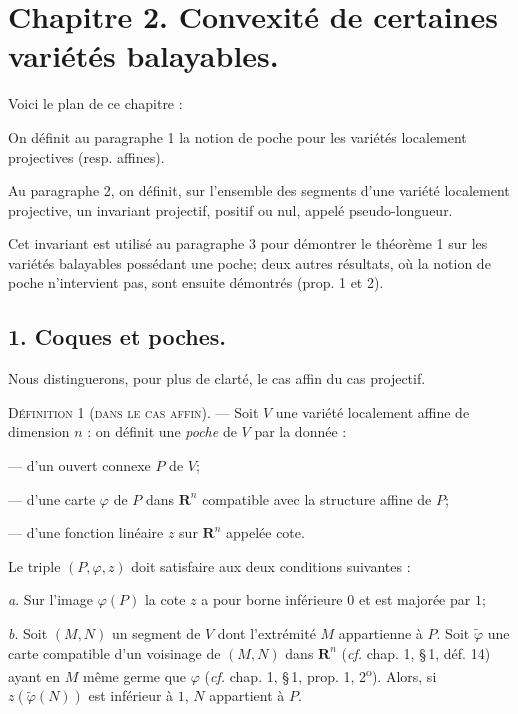 \documentclass[11pt]{article}
\newcommand{\R}{\boldsymbol{R}}
\newcommand{\bzcf}[2]{#1}
\newenvironment{defin}[1][]{\par\medskip\noindent\textsc{Définition #1.} --- }{\par\medskip}
\begin{document}
\section*{Chapitre 2. Convexité de certaines variétés balayables.}

Voici le plan de ce chapitre :

On définit au paragraphe 1 la notion de poche pour les variétés localement projectives (resp.
affines).

Au paragraphe 2, on définit, sur l'ensemble des segments d'une variété localement projective, un
invariant projectif, positif ou nul, appelé pseudo-longueur.

Cet invariant est utilisé au paragraphe 3 pour démontrer le \bzcf{théorème
1}{\ref{bzthm:c2s3t1_poche_balayable}} sur les variétés balayables possédant une poche; deux
autres résultats, où la notion de poche n'intervient pas, sont ensuite démontrés (\bzcf{prop.
1}{\ref{bzprop:c2s3p1_projection_non_bornee}} et
\bzcf{2}{\ref{bzprop:c2s3p2_hemisphere_corps_convexe}}).

\subsection*{1. Coques et poches.}

Nous distinguerons, pour plus de clarté, le cas affin du cas projectif.

\begin{defin}[1 (dans le cas affin)]
Soit $V$ une variété localement affine de dimension $n$ : on définit une \textit{poche} de $V$
par la donnée :

--- d'un ouvert connexe $P$ de $V$;

--- d'une carte $\varphi$ de $P$ dans $\R^n$ compatible avec la structure affine de $P$;

--- d'une fonction linéaire $z$ sur $\R^n$ appelée cote.

Le triple $(P, \varphi, z)$ doit satisfaire aux deux conditions suivantes :

\textit{a}. Sur l'image $\varphi(P)$ la cote $z$ a pour borne inférieure $0$ et est majorée par
$1$;

\textit{b}. Soit $(M, N)$ un segment de $V$ dont l'extrémité $M$ appartienne à $P$. Soit
$\tilde{\varphi}$ une carte compatible d'un voisinage de $(M, N)$ dans $\R^n$ (\bzcf{\textit{cf.}
chap. 1, \S\,1, déf. 14}{\ref{bzdef:c1s1d14_segment_variete}}) ayant en $M$ même germe que
$\varphi$ (\bzcf{\textit{cf.} chap. 1, \S\,1, prop. 1,
2\textsuperscript{o}}{\ref{bzprop:c1s1p1_cartes_compatibles}}). Alors, si $z(\tilde{\varphi}(N))$
est inférieur à $1$, $N$ appartient à $P$.
\end{defin}
\end{document}
